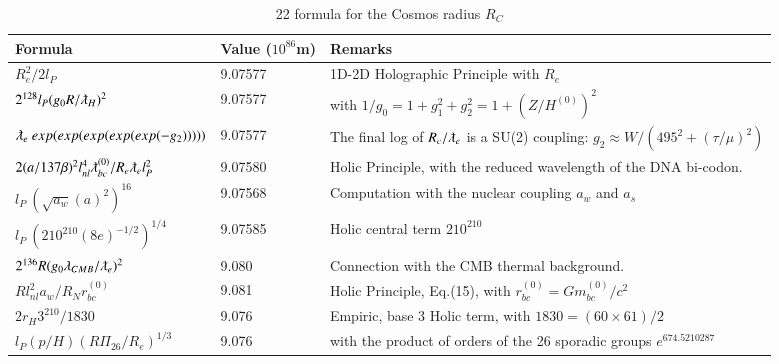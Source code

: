 \documentclass[a4paper,9pt]{article}
\newcounter{col}
\begin{document}
\begin{table}
\caption[Table \ref{CosmosTable}: 22 Cosmos radius formula]{22 formula for the Cosmos radius $R_C$}
\label{CosmosTable}
  \hskip-2.0cm\begin{tabular}{lll}
    \toprule
    \cmidrule(r){1-3}
    Formula     & Value ($10^{86}$m)  & Remarks \\
   \midrule
 
 $ R_e^2/2l_P $ & 9.07577 & 1D-2D Holographic Principle with $R_e$ \cite{Sanchez2}   \\
 
 
 $ 2^{128} l_P (g_0R/\lambdabar_H)^2 $ & 9.07577 & with $1/g_0 = 1+g_1^2 +g_2^2 = 1 + (Z/H^{(0)})^2$  \\
 
 $ \lambdabar_e ~ exp(exp(exp(exp(exp(-g_2)))))  $ & 9.07577 & The final log of $R_c/\lambdabar_e$ is a SU(2) coupling: $g_2 \approx W/(495^2+(\tau/\mu)^2)$  \\
 
 $ 2(a/137\beta)^2 l_{nl}^4 \lambdabar_{bc}^{(0)}/R_e \lambdabar_el_P^2 $ & 9.07580 & Holic Principle, with the reduced wavelength of the DNA bi-codon. \\
 
 
 
 $ l_P ~ (\sqrt{a_w}(a)^2)^{16}  $ & 9.07568 & Computation with the nuclear coupling $a_w$ and $a_s$  \\
 
 $ l_P ~ (210^{210}(8e)^{-1/2})^{1/4}  $ & 9.07585 & Holic central term $210^{210}$  \\
 
 
 $ 2^{136}R(g_0\lambda_{CMB}/\lambdabar_e)^2  $ & 9.080 & Connection with the CMB thermal background.    \\
 
 $ Rl_{nl}^2a_w/R_Nr_{bc}^{(0)} $ & 9.081 & Holic Principle, Eq.(15), with $ r_{bc}^{(0)}= Gm_{bc}^{(0)}/c^2$    \\
 
 $ 2r_H 3^{210}/1830$& 9.076 & Empiric, base 3 Holic term, with $ 1830 = (60\times 61)/2 $   \\
  
  $l_P(p/H) (R \Pi_{26}/R_e)^{1/3} $ & 9.076 & with the product of orders of the 26 sporadic groups $e^{674.5210287}$ \cite{Sanchez2}  \\ 
  

\end{tabular}
\end{table}
\end{document}
